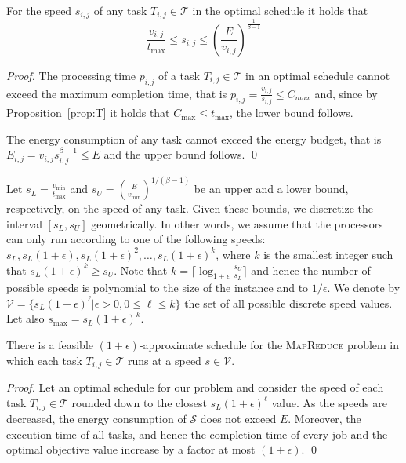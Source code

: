 \documentclass{llncs}
\newcommand{\mr}{\textsc{MapReduce}\xspace}
\begin{document}
\begin{proposition}\label{prop:speedbound}
For the speed $s_{i,j}$ of any task $T_{i,j} \in \mathcal{T}$ in the optimal schedule it holds that
\begin{equation*}
\frac{v_{i,j}}{t_{\max}}\leq s_{i,j} \leq \left(\frac{E}{v_{i,j}}\right)^{\frac{1}{\beta-1}}
\end{equation*}
\end{proposition}
\begin{proof}
The processing time $p_{i,j}$ of a task $T_{i,j} \in
\mathcal{T}$ in an  optimal schedule cannot exceed the maximum
completion time, that is  $p_{i,j}=\frac{v_{i,j}}{s_{i,j}} \leq
C_{max}$ and,  since by Proposition~\ref{prop:T} it holds that
$C_{\max} \leq t_{\max}$,  the lower bound follows.

The energy consumption of any task cannot exceed the energy
budget, that is $E_{i,j}=v_{i,j} s_{i,j}^{\beta-1} \leq E$ and
the upper bound follows.
\qed
\end{proof}

Let $s_L=\frac{v_{\min}}{t_{\max}}$ and $s_U=\left(\frac{E}{v_{\min}}\right)^{1/(\beta-1)}$ be
an upper and a lower bound, respectively, on the speed of any task.
Given these bounds, we discretize the interval $[s_L,s_U]$ geometrically.
In other words, we assume that the processors can only run according to one of the following speeds:
$s_L,s_L(1+\epsilon),s_L(1+\epsilon)^2,\ldots,s_L(1+\epsilon)^k$,
where $k$ is the smallest integer such that $s_L(1+\epsilon)^k \geq s_U$.
Note that $k=\lceil\log_{1+\epsilon}\frac{s_U}{s_L}\rceil$ and hence the number of possible speeds is polynomial to the size of the instance and to $1/\epsilon$.
We denote by $\mathcal{V}=\{s_L(1+\epsilon)^{\ell}|\epsilon>0, 0 \leq \ell \leq k\}$ the set of all possible discrete speed values.
Let also $s_{\max}=s_L(1+\epsilon)^k$.

\begin{lemma}\label{le:discretespeeds}
There is a feasible $(1+\epsilon)$-approximate schedule for the \mr problem in which each task $T_{i,j} \in \mathcal{T}$ runs at a speed $s \in \mathcal{V}$.
\end{lemma}
\begin{proof}
Let an optimal schedule for our problem and consider the speed of each task $T_{i,j} \in \mathcal{T}$
rounded down to the closest $s_L(1+\epsilon)^{\ell}$ value.
As the speeds are decreased, the energy consumption of $\mathcal{S}$ does not exceed $E$.
Moreover, the execution time of all tasks, and hence the completion time of every job
and the optimal objective value increase by a factor at most $(1+\epsilon)$. \qed
\end{proof}
\end{document}
